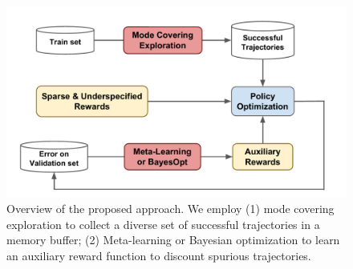 \begin{figure}[t]
\begin{center}
\includegraphics[width=1.0\columnwidth]{fig_method.pdf}
\end{center}
\vspace{-.15in}
\caption{Overview of the proposed approach. We employ (1) mode covering exploration to collect a diverse set of successful trajectories in a memory buffer;
(2) Meta-learning or Bayesian optimization to learn an auxiliary reward function to discount spurious trajectories.}
\label{fig:fig3}
\vspace{-.05in}
\end{figure}
